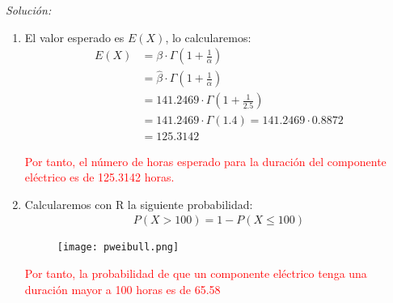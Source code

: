\documentclass[12pt]{article}
\newenvironment{sol}
    {\emph{Solución:}
    }
    {
    }
\begin{document}
\begin{sol}
\begin{enumerate}[label=\alph*)]
\pagebreak

\item El valor esperado es $E(X)$, lo calcularemos:
\begin{align*}
E(X) &= \beta \cdot \Gamma(1+\frac{1}{\alpha})\\
 &= \hat{\beta} \cdot \Gamma (1+\frac{1}{\alpha})\\
 &= 141.2469 \cdot \Gamma(1+\frac{1}{2.5}) \\
 &= 141.2469 \cdot \Gamma(1.4) = 141.2469 \cdot 0.8872 \\
 &= 125.3142
\end{align*} 

\textcolor{red}{%
    Por tanto, el número de horas esperado para la duración del componente eléctrico es de 125.3142 horas.  
}

\item Calcularemos con R la siguiente probabilidad:
\begin{align*}
	P(X>100) = 1-P(X\leq 100)
\end{align*}

\begin{figure}[h]  %
    \centering      %
    \texttt{[image: pweibull.png]} 
\end{figure}
\textcolor{red}{%
    Por tanto, la probabilidad de que un componente eléctrico tenga una duración mayor a 100 horas es de 65.58%
}
\end{enumerate}
\end{sol}





\end{document}
